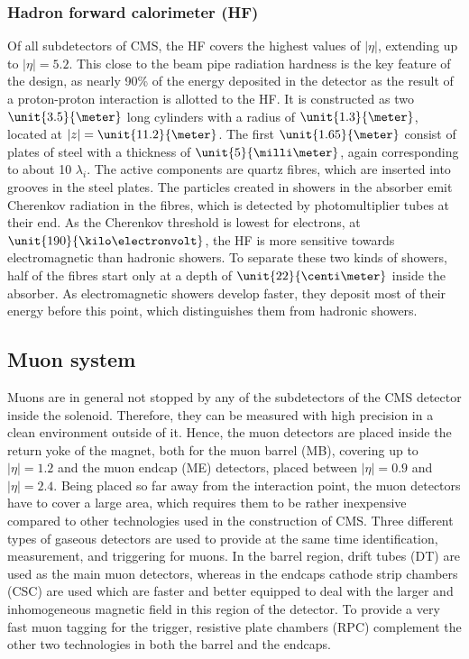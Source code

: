 \subsubsection*{Hadron forward calorimeter (HF)}
Of all subdetectors of CMS, the HF covers the highest values of $\vert\eta\vert$, extending up to $\vert\eta\vert = 5.2$. This close to the beam pipe radiation hardness is the key feature of the design, as nearly 90\% of the energy deposited in the detector as the result of a proton-proton interaction is allotted to the HF. It is constructed as two $\unit{3.5}{\meter}$ long cylinders with a radius of $\unit{1.3}{\meter}$, located at $\vert z \vert = \unit{11.2}{\meter}$. The first $\unit{1.65}{\meter}$ consist of plates of steel with a thickness of $\unit{5}{\milli\meter}$, again corresponding to about 10 $\lambda_i$. The active components are quartz fibres, which are inserted into grooves in the steel plates. The particles created in showers in the absorber emit Cherenkov radiation in the fibres, which is detected by photomultiplier tubes at their end. As the Cherenkov threshold is lowest for electrons, at $\unit{190}{\kilo\electronvolt}$, the HF is more sensitive towards electromagnetic than hadronic showers. To separate these two kinds of showers, half of the fibres start only at a depth of $\unit{22}{\centi\meter}$ inside the absorber. As electromagnetic showers develop faster, they deposit most of their energy before this point, which distinguishes them from hadronic showers. 	     
\subsection{Muon system} 
Muons are in general not stopped by any of the subdetectors of the CMS detector inside the solenoid. Therefore, they can be measured with high precision in a clean environment outside of it. Hence, the muon detectors are placed inside the return yoke of the magnet, both for the muon barrel (MB), covering up to $\vert\eta\vert = 1.2$ and the muon endcap (ME) detectors, placed between $\vert\eta\vert = 0.9$ and $\vert\eta\vert = 2.4$. Being placed so far away from the interaction point, the muon detectors have to cover a large area, which requires them to be rather inexpensive compared to other technologies used in the construction of CMS. Three different types of gaseous detectors are used to provide at the same time identification, \pt measurement, and triggering for muons. In the barrel region, drift tubes (DT) are used as the main muon detectors, whereas in the endcaps cathode strip chambers (CSC) are used which are faster and better equipped to deal with the larger and inhomogeneous magnetic field in this region of the detector. To provide a very fast muon tagging for the trigger, resistive plate chambers (RPC) complement the other two technologies in both the barrel and the endcaps. 
